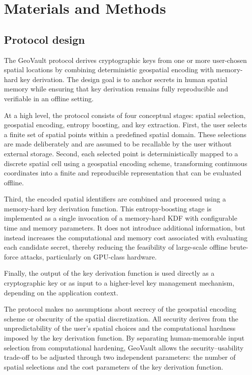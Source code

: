 \documentclass[journal,article,accept,pdftex,moreauthors]{Definitions/mdpi}
\begin{document}
\section{Materials and Methods}

\subsection{Protocol design}

The GeoVault protocol derives cryptographic keys from one or more user-chosen spatial locations by combining deterministic geospatial encoding with memory-hard key derivation. The design goal is to anchor secrets in human spatial memory while ensuring that key derivation remains fully reproducible and verifiable in an offline setting.

At a high level, the protocol consists of four conceptual stages: spatial selection, geospatial encoding, entropy boosting, and key extraction. First, the user selects a finite set of spatial points within a predefined spatial domain. These selections are made deliberately and are assumed to be recallable by the user without external storage. Second, each selected point is deterministically mapped to a discrete spatial cell using a geospatial encoding scheme, transforming continuous coordinates into a finite and reproducible representation that can be evaluated offline.

Third, the encoded spatial identifiers are combined and processed using a memory-hard key derivation function. This entropy-boosting stage is implemented as a single invocation of a memory-hard KDF with configurable time and memory parameters. It does not introduce additional information, but instead increases the computational and memory cost associated with evaluating each candidate secret, thereby reducing the feasibility of large-scale offline brute-force attacks, particularly on GPU-class hardware.

Finally, the output of the key derivation function is used directly as a cryptographic key or as input to a higher-level key management mechanism, depending on the application context.

The protocol makes no assumptions about secrecy of the geospatial encoding scheme or obscurity of the spatial discretization. All security derives from the unpredictability of the user’s spatial choices and the computational hardness imposed by the key derivation function. By separating human-memorable input selection from computational hardening, GeoVault allows the security--usability trade-off to be adjusted through two independent parameters: the number of spatial selections and the cost parameters of the key derivation function.
\end{document}
